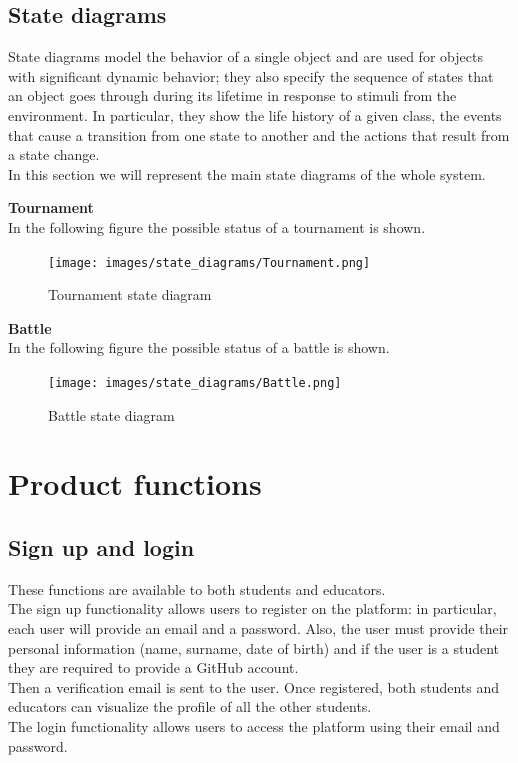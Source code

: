 \subsection{State diagrams}
State diagrams model the behavior of a single object and are used for objects with 
significant dynamic behavior; they also specify the sequence of states that an 
object goes through during its lifetime in response to stimuli from the environment.
In particular, they show the life history of a given class, the events that cause a transition
from one state to another and the actions that result from a state change.\\
In this section we will represent the main state diagrams of the whole system.

\textbf{Tournament}\\
In the following figure the possible status of a tournament is shown. \\
\begin{figure} [H]
  \centering
  \texttt{[image: images/state\_diagrams/Tournament.png]}
  \caption{Tournament state diagram}
\end{figure} \vspace{1cm}

\textbf{Battle}\\
In the following figure the possible status of a battle is shown. \\
\begin{figure} [H]
  \centering
  \texttt{[image: images/state\_diagrams/Battle.png]}
  \caption{Battle state diagram}
\end{figure} \vspace{1cm}


\section{Product functions}
\subsection{Sign up and login}
These functions are available to both students and educators.\\
The sign up functionality allows users to register on the platform: in particular, each user will provide an email 
and a password. Also, the user must provide their personal information (name, surname, date of birth) and 
if the user is a student they are required to provide a GitHub account.\\
Then a verification email is sent to the user.
Once registered, both students and educators can visualize the profile of all the other students.\\
The login functionality allows users to access the platform using their email and password.\\

